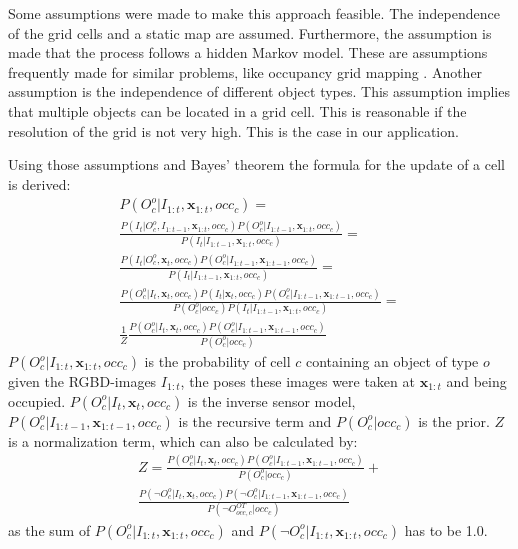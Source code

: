 Some assumptions were made to make this approach feasible. The independence of the grid cells and a static map are assumed. Furthermore, the assumption is made that the process follows a hidden Markov model. These are assumptions frequently made for similar problems, like occupancy grid mapping \cite{mapKnownPose}. Another assumption is the independence of different object types. This assumption implies that multiple objects can be located in a grid cell. This is reasonable if the resolution of the grid is not very high. This is the case in our application. 

Using those assumptions and Bayes' theorem the formula for the update of a cell is derived: 
\begin{multline}
P(O_{c}^{o}|I_{1:t}, \mathbf{x}_{1:t},occ_{c}) =  \\ 
 \frac{P(I_{t}|O_{c}^{o},I_{1:t-1}, \mathbf{x}_{1:t},occ_{c})P(O_{c}^{o}|I_{1:t-1}, \mathbf{x}_{1:t},occ_{c})}
 {P(I_{t}|I_{1:t-1},\mathbf{x}_{1:t},occ_{c})} = \\
 \frac{P(I_{t}|O_{c}^{o}, \mathbf{x}_{t},occ_{c})P(O_{c}^{o}|I_{1:t-1}, \mathbf{x}_{1:t-1},occ_{c})}
 {P(I_{t}|I_{1:t-1}, \mathbf{x}_{1:t},occ_{c})} = \\
 \frac{P(O_{c}^{o}|I_{t}, \mathbf{x}_{t},occ_{c})P(I_{t}| \mathbf{x}_{t},occ_{c})P(O_{c}^{o}|I_{1:t-1}, \mathbf{x}_{1:t-1},occ_{c})}
 {P(O_{c}^{o}|occ_{c})P(I_{t}|I_{1:t-1}, \mathbf{x}_{1:t},occ_{c})} 
 = \\ \frac{1}{Z} 
 \frac{P(O_{c}^{o}|I_{t}, \mathbf{x}_{t},occ_{c})P(O_{c}^{o}|I_{1:t-1}, \mathbf{x}_{1:t-1},occ_{c})}
 {P(O_{c}^{o}|occ_{c})}
\end{multline}
$P(O_{c}^{o}|I_{1:t}, \mathbf{x}_{1:t},occ_{c})$ is the probability of cell $c$ containing an object of type $o$ given the RGBD-images $I_{1:t}$, the poses these images were taken at $\mathbf{x}_{1:t}$ and being occupied. $P(O_{c}^{o}|I_{t}, \mathbf{x}_{t},occ_{c})$ is the inverse sensor model,\linebreak $P(O_{c}^{o}|I_{1:t-1}, \mathbf{x}_{1:t-1},occ_{c})$ is the recursive term and $P(O_{c}^{o}|occ_{c})$ is the prior. $Z$ is a normalization term, which can also be calculated by: 
\begin{multline}
 Z=\frac{P(O_{c}^{o}|I_{t}, \mathbf{x}_{t},occ_{c})P(O_{c}^{o}|I_{1:t-1}, \mathbf{x}_{1:t-1},occ_{c})}{P(O_{c}^{o}|occ_{c})}+\\ \frac{P(\neg O_{c}^{o}|I_{t}, \mathbf{x}_{t},occ_{c})P(\neg O_{c}^{o}|I_{1:t-1}, \mathbf{x}_{1:t-1},occ_{c})}{P(\neg O_{occ,c}^{OT}|occ_{c})}
\end{multline}
as the sum of $P(O_{c}^{o}|I_{1:t}, \mathbf{x}_{1:t},occ_{c})$ and $P(\neg O_{c}^{o}|I_{1:t}, \mathbf{x}_{1:t},occ_{c})$ has to be 1.0. 

